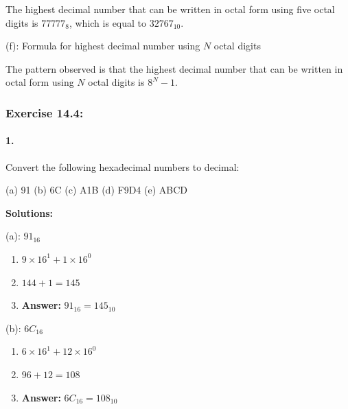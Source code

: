 \documentclass{article}
\begin{document}
\vspace*{0.25cm}

\noindent The highest decimal number that can be written in octal form using five octal digits is $77777_8$, which is equal to $32767_{10}$.

\vspace*{0.5cm}

\noindent (f): Formula for highest decimal number using $N$ octal digits

\vspace*{0.25cm}

\noindent The pattern observed is that the highest decimal number that can be written in octal form using $N$ octal digits is $8^N - 1$.

\newpage

\subsubsection*{Exercise 14.4:}

\paragraph*{1.}

Convert the following hexadecimal numbers to decimal:

(a) 91 (b) 6C (c) A1B (d) F9D4 (e) ABCD

\vspace*{0.5cm}

\noindent \textbf{Solutions:}

\vspace*{0.25cm}

\noindent (a): $91_{16}$

\begin{enumerate}
    \item $9 \times 16^1 + 1 \times 16^0$
    \item $144 + 1 = 145$
    \item \textbf{Answer:} $91_{16} = 145_{10}$
\end{enumerate}

\vspace*{0.5cm}

\noindent (b): $6C_{16}$

\begin{enumerate}
    \item $6 \times 16^1 + 12 \times 16^0$
    \item $96 + 12 = 108$
    \item \textbf{Answer:} $6C_{16} = 108_{10}$
\end{enumerate}
\end{document}

